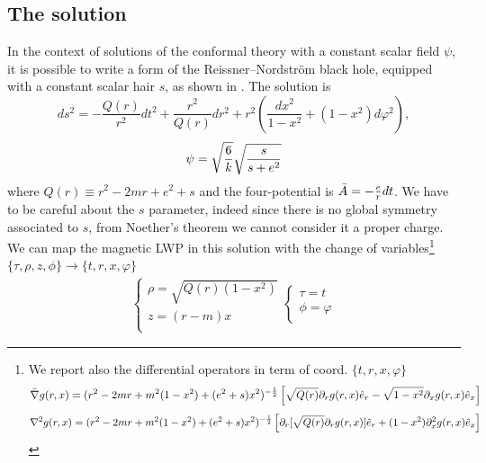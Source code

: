\subsection{The solution}
In the context of solutions of the conformal theory with a constant scalar field $\psi$, it is possible to write a form of the Reissner–Nordström black hole, equipped with a constant scalar hair $s$, as shown in \citep{C-metric}. The solution is 
\begin{equation}
    ds^2 = -\frac{Q(r)}{r^2} dt^2 + \frac{r^2}{Q(r)} dr^2 + r^2\left(\frac{dx^2}{1-x^2}+(1-x^2) d\varphi^2\right),
    \label{Reissner nordstrom peloso con x}
\end{equation}
\begin{equation}
    \psi = \sqrt{\frac{6}{k}}\sqrt{\frac{s}{s+e^2}}
    \notag
\end{equation}
where $Q(r)\equiv r^2-2mr+e^2+s$ and the four-potential is $\Bar{A} = -\frac{e}{r} dt$. We have to be careful about the $s$ parameter, indeed since there is no global symmetry associated to $s$, from Noether's theorem we cannot consider it a proper charge. We can map the magnetic LWP in this solution with the change of variables\footnote{We report also the differential operators in term of coord. $\{t,r,x,\varphi\}$
\begin{equation}
\Bar{\nabla}g(r,x)=(r^2-2mr+m^2(1-x^2) + (e^2+s)x^2)^{-\frac{1}{2}}\left[\sqrt{Q(r)}\partial_rg(r,x)\hat{e}_r -\sqrt{1-x^2}\partial_xg(r,x)\hat{e}_x\right] \notag
\end{equation}
\begin{equation}
\nabla^2g(r,x)=(r^2-2mr+m^2(1-x^2) + (e^2+s)x^2)^{-\frac{1}{2}}\left[\partial_r[\sqrt{Q(r)}\partial_rg(r,x)]\hat{e}_r + (1-x^2)\partial_x^2g(r,x)\hat{e}_x\right] \notag
\end{equation}
} 
$\{\tau,\rho,z,\phi\} \rightarrow \{t,r,x,\varphi\}$
\begin{equation*}
    \begin{aligned}
        \begin{cases}
           \rho  = \sqrt{Q(r)(1-x^2)} \\
           z = (r-m)x \\
        \end{cases}
        \begin{cases}
            \tau = t \\
            \phi = \varphi \\
        \end{cases}
    \end{aligned}
\end{equation*}
